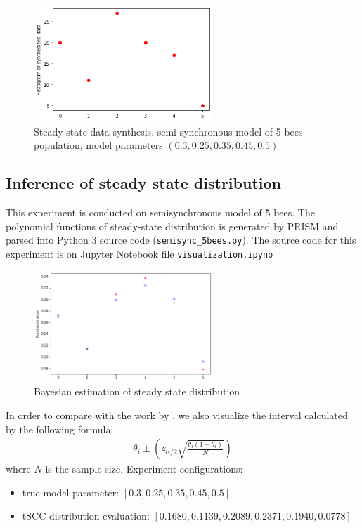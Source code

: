 \documentclass[12pt]{article}
\theoremstyle{definition}
\begin{document}
\begin{figure}[H]
  \centering
  \includegraphics[width=0.6\textwidth,keepaspectratio]{figures/data_synthesis.png}
  \caption{Steady state data synthesis, semi-synchronous model of 5 bees
    population, model parameters $(0.3, 0.25, 0.35, 0.45, 0.5)$}
\end{figure}

\subsection{Inference of steady state distribution}
This experiment is conducted on semisynchronous model of 5 bees. The polynomial
functions of steady-state distribution is generated by PRISM and parsed into
Python 3 source code
(\texttt{semisync\_5bees.py}). The source code for this
experiment is on Jupyter Notebook file \texttt{visualization.ipynb}
\begin{figure}[H]
  \centering
  \includegraphics[width=0.6\textwidth,keepaspectratio]{figures/point_estimation.png}
  \caption{Bayesian estimation of steady state distribution}
\end{figure}
In order to compare with the work by \cite{hajnal2019data}, we also visualize
the interval calculated by the following formula:
\begin{align*}
  \theta_i \pm (z_{\alpha / 2}\sqrt{\frac{\theta_i(1-\theta_i)}{N}})
\end{align*}
where $N$ is the sample size. Experiment configurations:
\begin{itemize}
\item true model parameter: $[0.3, 0.25, 0.35, 0.45, 0.5]$
\item tSCC distribution evaluation: $[0.1680, 0.1139, 0.2089, 0.2371, 0.1940, 0.0778]$ 
\end{itemize}
\end{document}
